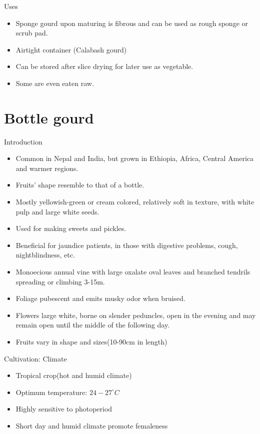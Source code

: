 \documentclass[
  ignorenonframetext,
  aspectratio=169]{beamer}
\providecommand{\tightlist}{%
  \setlength{\itemsep}{0pt}\setlength{\parskip}{0pt}}
\begin{document}
\begin{frame}{Uses}
\protect\hypertarget{uses}{}
\begin{itemize}
\tightlist
\item
  Sponge gourd upon maturing is fibrous and can be used as rough sponge
  or scrub pad.
\item
  Airtight container (Calabash gourd)
\item
  Can be stored after slice drying for later use as vegetable.
\item
  Some are even eaten raw.
\end{itemize}
\end{frame}

\hypertarget{bottle-gourd}{%
\section{Bottle gourd}\label{bottle-gourd}}

\begin{frame}{Introduction}
\protect\hypertarget{introduction-1}{}
\begin{itemize}
\tightlist
\item
  Common in Nepal and India, but grown in Ethiopia, Africa, Central
  America and warmer regions.
\item
  Fruits' shape resemble to that of a bottle.
\item
  Mostly yellowish-green or cream colored, relatively soft in texture,
  with white pulp and large white seeds.
\item
  Used for making sweets and pickles.
\item
  Beneficial for jaundice patients, in those with digestive problems,
  cough, nightblindness, etc.
\item
  Monoecious annual vine with large oxalate oval leaves and branched
  tendrils spreading or climbing 3-15m.
\item
  Foliage pubescent and emits musky odor when bruised.
\item
  Flowers large white, borne on slender peduncles, open in the evening
  and may remain open until the middle of the following day.
\item
  Fruits vary in shape and sizes(10-90cm in length)
\end{itemize}
\end{frame}

\begin{frame}{Cultivation: Climate}
\protect\hypertarget{cultivation-climate}{}
\begin{itemize}
\tightlist
\item
  Tropical crop(hot and humid climate)
\item
  Optimum temperature: \(24-27^\circ C\)
\item
  Highly sensitive to photoperiod
\item
  Short day and humid climate promote femaleness
\end{itemize}
\end{frame}
\end{document}
